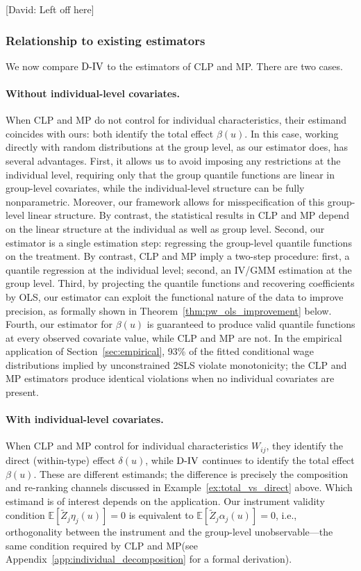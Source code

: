 \documentclass[12pt]{article}
\newcommand{\nddvd}[1]{{\color{blue}[David: #1]}}
\newcommand{\E}{\mathbb{E}}
\newcommand{\est}{\ensuremath{\textnormal{D-IV}}\xspace}
\newcommand{\CLP}{CLP\xspace}
\newcommand{\MP}{MP\xspace}
\begin{document}
\nddvd{Left off here}

\subsubsection{Relationship to existing estimators}
\label{sec:relationship_existing_literature}

We now compare $\est$ to the estimators of \CLP and \MP. There are two cases.

\paragraph{Without individual-level covariates.} When \CLP and \MP do not control for individual characteristics, their estimand coincides with ours: both identify the total effect $\beta(u)$. In this case, working directly with random distributions at the group level, as our estimator does, has several advantages. First, it allows us to avoid imposing any restrictions at the individual level, requiring only that the group quantile functions are linear in group-level covariates, while the individual-level structure can be fully nonparametric. Moreover, our framework allows for misspecification of this group-level linear structure. By contrast, the statistical results in \CLP and \MP depend on the linear structure at the individual as well as group level. Second, our estimator is a single estimation step: regressing the group-level quantile functions on the treatment. By contrast, \CLP and \MP imply a two-step procedure: first, a quantile regression at the individual level; second, an IV/GMM estimation at the group level. Third, by projecting the quantile functions and recovering coefficients by OLS, our estimator can exploit the functional nature of the data to improve precision, as formally shown in Theorem~\ref{thm:pw_ols_improvement} below. Fourth, our estimator for $\beta(u)$ is guaranteed to produce valid quantile functions at every observed covariate value, while \CLP and \MP are not. In the empirical application of Section~\ref{sec:empirical}, 93\% of the fitted conditional wage distributions implied by unconstrained 2SLS violate monotonicity; the \CLP and \MP estimators produce identical violations when no individual covariates are present.

\paragraph{With individual-level covariates.} When \CLP and \MP control for individual characteristics $W_{ij}$, they identify the direct (within-type) effect $\delta(u)$, while \est continues to identify the total effect $\beta(u)$. These are different estimands; the difference is precisely the composition and re-ranking channels discussed in Example~\ref{ex:total_vs_direct} above. Which estimand is of interest depends on the application. Our instrument validity condition $\E[\tilde{Z}_j \eta_j(u)] = 0$ is equivalent to $\E[\tilde{Z}_j \alpha_j(u)] = 0$, i.e., orthogonality between the instrument and the group-level unobservable---the same condition required by \CLP and \MP (see Appendix~\ref{app:individual_decomposition} for a formal derivation).
\end{document}
